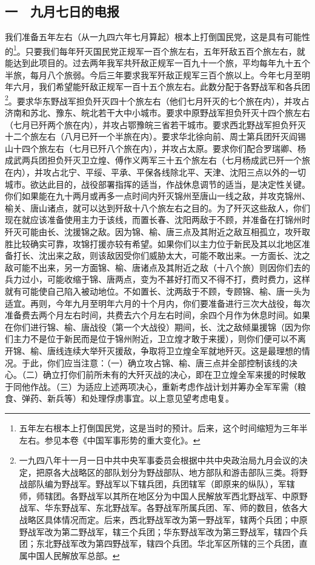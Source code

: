 \documentclass[cn,11pt,chinese]{elegantbook}
\def\myformat#1{\hfil\hfil #1}
\begin{document}
\subsection*{\myformat{一　九月七日的电报}}
我们准备五年左右（从一九四六年七月算起）根本上打倒国民党，这是具有可能性的\footnote[2]{ 五年左右根本上打倒国民党，这是当时的预计。后来，这个时间缩短为三年半左右。参见本卷《中国军事形势的重大变化》。}。只要我们每年歼灭国民党正规军一百个旅左右，五年歼敌五百个旅左右，就能达到此项目的。过去两年我军共歼敌正规军一百九十一个旅，平均每年九十五个半旅，每月八个旅弱。今后三年要求我军歼敌正规军三百个旅以上。今年七月至明年六月，我们希望能歼敌正规军一百十五个旅左右。此数分配于各野战军和各兵团\footnote[3]{ 一九四八年十一月一日中共中央军事委员会根据中共中央政治局九月会议的决定，把原各大战略区的部队划分为野战部队、地方部队和游击部队三类。将野战部队编为野战军。野战军以下辖兵团，兵团辖军（即原来的纵队），军辖师，师辖团。各野战军以其所在地区分为中国人民解放军西北野战军、中原野战军、华东野战军、东北野战军。各野战军所属兵团、军、师的数目，依各大战略区具体情况而定。后来，西北野战军改为第一野战军，辖两个兵团；中原野战军改为第二野战军，辖三个兵团；华东野战军改为第三野战军，辖四个兵团；东北野战军改为第四野战军，辖四个兵团。华北军区所辖的三个兵团，直属中国人民解放军总部。}。要求华东野战军担负歼灭四十个旅左右（他们七月歼灭的七个旅在内），并攻占济南和苏北、豫东、皖北若干大中小城市。要求中原野战军担负歼灭十四个旅左右（七月已歼两个旅在内），并攻占鄂豫皖三省若干城市。要求西北野战军担负歼灭十二个旅左右（八月已歼一个半旅在内）。要求华北徐向前、周士第兵团歼灭阎锡山十四个旅左右（七月已歼八个旅在内），并攻占太原。要求你们配合罗瑞卿、杨成武两兵团担负歼灭卫立煌、傅作义两军三十五个旅左右（七月杨成武已歼一个旅在内），并攻占北宁、平绥、平承、平保各线除北平、天津、沈阳三点以外的一切城市。欲达此目的，战役部署指挥的适当，作战休息调节的适当，是决定性关键。你们如果能在九十两月或再多一点时间内歼灭锦州至唐山一线之敌，并攻克锦州、榆关、唐山诸点，就可以达到歼敌十八个旅左右之目的。为了歼灭这些敌人，你们现在就应该准备使用主力于该线，而置长春、沈阳两敌于不顾，并准备在打锦州时歼灭可能由长、沈援锦之敌。因为锦、榆、唐三点及其附近之敌互相孤立，攻歼取胜比较确实可靠，攻锦打援亦较有希望。如果你们以主力位于新民及其以北地区准备打长、沈出来之敌，则该敌因受你们威胁太大，可能不敢出来。一方面长、沈之敌可能不出来，另一方面锦、榆、唐诸点及其附近之敌（十八个旅）则因你们去的兵力过小，可能收缩于锦、唐两点，变为不甚好打而又不得不打，费时费力，这样就有可能使自己陷入被动地位。不如置长、沈两敌于不顾，专顾锦、榆、唐一头为适宜。再则，今年九月至明年六月的十个月内，你们要准备进行三次大战役，每次准备费去两个月左右时间，共费去六个月左右时间，余四个月作为休息时间。如果在你们进行锦、榆、唐战役（第一个大战役）期间，长、沈之敌倾巢援锦（因为你们主力不是位于新民而是位于锦州附近，卫立煌才敢于来援），则你们便可以不离开锦、榆、唐线连续大举歼灭援敌，争取将卫立煌全军就地歼灭。这是最理想的情况。于此，你们应当注意：（一）确立攻占锦、榆、唐三点并全部控制该线的决心。（二）确立打你们前所未有的大歼灭战的决心，即在卫立煌全军来援的时候敢于同他作战。（三）为适应上述两项决心，重新考虑作战计划并筹办全军军需（粮食、弹药、新兵等）和处理俘虏事宜。以上意见望考虑电复。\\
\end{document}
